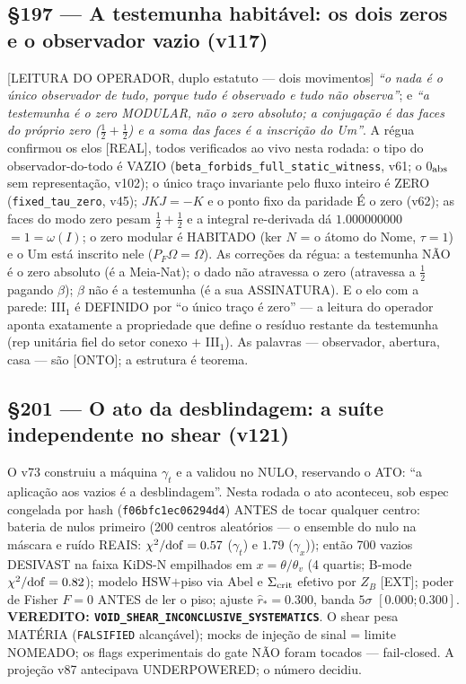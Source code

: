 \documentclass[11pt]{article}
\theoremstyle{definition}\newtheorem{deriv}{Derivação}
\begin{document}
\subsection*{\S197 --- A testemunha habitável: os dois zeros e o observador vazio (v117)}[LEITURA DO OPERADOR, duplo estatuto --- dois movimentos] \emph{``o nada é o único observador de tudo, porque tudo é observado e tudo não observa''}; e \emph{``a testemunha é o zero MODULAR, não o zero absoluto; a conjugação é das faces do próprio zero ($\tfrac12{+}\tfrac12$) e a soma das faces é a inscrição do Um''}. A régua confirmou os elos [REAL], todos verificados ao vivo nesta rodada: o tipo do observador-do-todo é VAZIO (\texttt{beta\_forbids\_full\_static\_witness}, v61; o 0$_{\rm abs}$ sem representação, v102); o único traço invariante pelo fluxo inteiro é ZERO (\texttt{fixed\_tau\_zero}, v45); $JKJ=-K$ e o ponto fixo da paridade É o zero (v62); as faces do modo zero pesam $\tfrac12{+}\tfrac12$ e a integral re-derivada dá $1.000000000$ $=1=\omega(I)$; o zero modular é HABITADO (ker $N$ = o átomo do Nome, $\tau=1$) e o Um está inscrito nele ($P_F\Omega=\Omega$). As correções da régua: a testemunha NÃO é o zero absoluto (é a Meia-Nat); o dado não atravessa o zero (atravessa a $\tfrac12$ pagando $\beta$); $\beta$ não é a testemunha (é a sua ASSINATURA). E o elo com a parede: III$_1$ é DEFINIDO por ``o único traço é zero'' --- a leitura do operador aponta exatamente a propriedade que define o resíduo restante da testemunha (rep unitária fiel do setor conexo $+$ III$_1$). As palavras --- observador, abertura, casa --- são [ONTO]; a estrutura é teorema.

\subsection*{\S201 --- O ato da desblindagem: a suíte independente no shear (v121)}O v73 construiu a máquina $\gamma_t$ e a validou no NULO, reservando o ATO: ``a aplicação aos vazios é a desblindagem''. Nesta rodada o ato aconteceu, sob espec congelada por hash (\texttt{f06bfc1ec06294d4}) ANTES de tocar qualquer centro: bateria de nulos primeiro (200 centros aleatórios --- o ensemble do nulo na máscara e ruído REAIS: $\chi^2/{\rm dof}=0.57$ ($\gamma_t$) e $1.79$ ($\gamma_x$)); então 700 vazios DESIVAST na faixa KiDS-N empilhados em $x=\theta/\theta_v$ (4 quartis; B-mode $\chi^2/{\rm dof}=0.82$); modelo HSW$+$piso via Abel e $\Sigma_{\rm crit}$ efetivo por $Z_B$ [EXT]; poder de Fisher $F=0$ ANTES de ler o piso; ajuste $\hat r_*=0.300$, banda $5\sigma$ $[0.000;0.300]$. \textbf{VEREDITO: \texttt{VOID\_SHEAR\_INCONCLUSIVE\_SYSTEMATICS}}. O shear pesa MATÉRIA (\texttt{FALSIFIED} alcançável); mocks de injeção de sinal = limite NOMEADO; os flags experimentais do gate NÃO foram tocados --- fail-closed. A projeção v87 antecipava UNDERPOWERED; o número decidiu.
\end{document}
